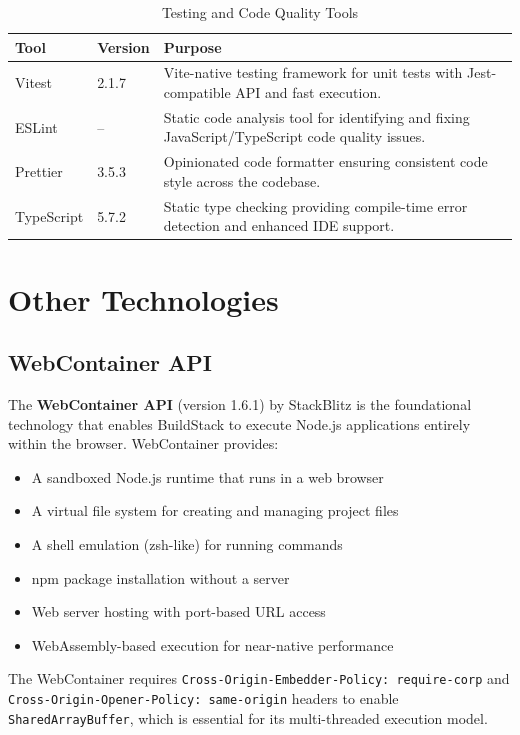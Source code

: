 \documentclass[12pt,a4paper,openany]{report}
\begin{document}
\begin{table}[H]
\centering
\caption{Testing and Code Quality Tools}
\label{tab:testing}
\begin{tabular}{|p{3.5cm}|p{2cm}|p{6.5cm}|}
\hline
\textbf{Tool} & \textbf{Version} & \textbf{Purpose} \\
\hline
Vitest & 2.1.7 & Vite-native testing framework for unit tests with Jest-compatible API and fast execution. \\
\hline
ESLint & -- & Static code analysis tool for identifying and fixing JavaScript/TypeScript code quality issues. \\
\hline
Prettier & 3.5.3 & Opinionated code formatter ensuring consistent code style across the codebase. \\
\hline
TypeScript & 5.7.2 & Static type checking providing compile-time error detection and enhanced IDE support. \\
\hline
\end{tabular}
\end{table}

\section{Other Technologies}

\subsection{WebContainer API}
The \textbf{WebContainer API} (version 1.6.1) by StackBlitz is the foundational technology that enables BuildStack to execute Node.js applications entirely within the browser. WebContainer provides:
\begin{itemize}
    \item A sandboxed Node.js runtime that runs in a web browser
    \item A virtual file system for creating and managing project files
    \item A shell emulation (zsh-like) for running commands
    \item npm package installation without a server
    \item Web server hosting with port-based URL access
    \item WebAssembly-based execution for near-native performance
\end{itemize}

The WebContainer requires \texttt{Cross-Origin-Embedder-Policy: require-corp} and \texttt{Cross-Origin-Opener-Policy: same-origin} headers to enable \texttt{SharedArrayBuffer}, which is essential for its multi-threaded execution model.
\end{document}
